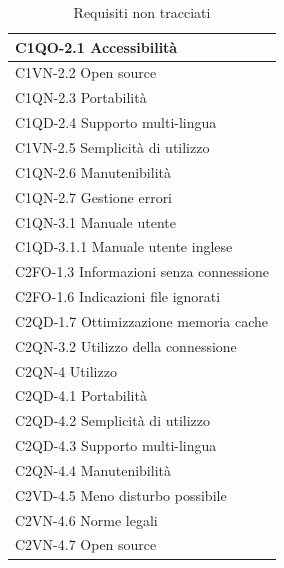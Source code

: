 \begin{table}[!h]
\begin{footnotesize}
\begin{tabular}{|l|}
C1QO-2.1 Accessibilit\`a \\ \hline
C1VN-2.2 Open source \\ \hline
C1QN-2.3 Portabilit\`a \\ \hline
C1QD-2.4 Supporto multi-lingua \\ \hline
C1VN-2.5 Semplicit\`a di utilizzo \\ \hline
C1QN-2.6 Manutenibilit\`a \\ \hline
C1QN-2.7 Gestione errori \\ \hline
C1QN-3.1 Manuale utente \\ \hline
C1QD-3.1.1 Manuale utente inglese \\ \hline
C2FO-1.3 Informazioni senza connessione \\ \hline
C2FO-1.6 Indicazioni file ignorati \\ \hline
C2QD-1.7 Ottimizzazione memoria cache \\ \hline 
C2QN-3.2 Utilizzo della connessione \\ \hline
C2QN-4 Utilizzo \\ \hline 
C2QD-4.1 Portabilit\`a \\ \hline
C2QD-4.2 Semplicit\`a di utilizzo \\ \hline
C2QD-4.3 Supporto multi-lingua \\ \hline
C2QN-4.4 Manutenibilit\`a \\ \hline
C2VD-4.5 Meno disturbo possibile \\ \hline
C2VN-4.6 Norme legali \\ \hline
C2VN-4.7 Open source \\ \hline
\end{tabular}
\end{footnotesize}
\caption{Requisiti non tracciati}
\end{table}


\listoftables
{}
\listoffigures
{}

